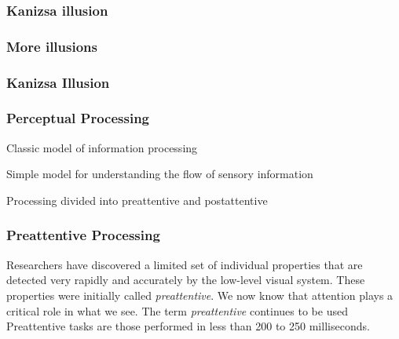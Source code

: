 \documentclass[12pt]{beamer}\usepackage[]{graphicx}\usepackage[]{color}
\begin{document}
\begin{frame}
\frametitle{Kanizsa illusion}
\begin{center}
\end{center}
\end{frame}


\begin{frame}
\frametitle{More illusions}
\begin{center}
\end{center}
\end{frame}


\begin{frame}
\frametitle{Kanizsa Illusion}
\begin{center}
\end{center}
\end{frame}


\begin{frame}
\begin{center}
\Huge{}
\end{center}
\end{frame}


\begin{frame}
\frametitle{Perceptual Processing}

\bbi
  \item Classic model of information processing
  \item Simple model for understanding the flow of sensory information
  \item Processing divided into preattentive and postattentive
\ei

\end{frame}


\begin{frame}
\frametitle{Preattentive Processing}

  Researchers have discovered a limited set of individual properties that 
  are detected very rapidly and accurately by the low-level visual system.
  These properties were initially called \textit{preattentive}. 
  We now know that attention plays a critical role in what we see.
  The term \textit{preattentive} continues to be used
  Preattentive tasks are those performed in less than 200 to 250 milliseconds.
\eb

\end{frame}
\end{document}
